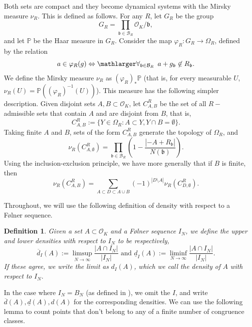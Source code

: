 \documentclass[a4paper,11pt,reqno]{amsart}
\theoremstyle{plain}
\newtheorem{definition}[theorem]{Definition}
\theoremstyle{remark}
\newcommand{\cb}{\mathcal{B}}
\newcommand{\cbr}{\mathcal{B}_R}
\newcommand{\co}{\mathcal{O}}
\newcommand{\gb}{\mathfrak{b}}
\newcommand{\mmp}{\mathbb{P}}
\begin{document}
Both sets are compact and they become dynamical systems with the Mirsky measure $\nu_R$. This is defined as follows. For any $R$, let $G_R$ be the group
\begin{equation}
	\label{eq:GR}
	G_R = \prod_{\gb \in \cb_R} \co_K/\gb,
\end{equation}
  and let $\mmp$ be the Haar measure in $G_R$. Consider the map $\varphi_R:G_R \rightarrow \Omega_R$, defined by the relation \begin{equation}
	a \in \varphi_R(g) \Leftrightarrow \mathlarger \forall_{\gb \in \cbr} \hspace{5pt} a+g_\gb \not \in R_\gb.
\end{equation} 	We define the Mirsky measure $\nu_R$ as $(\varphi_R)_*\mmp$ (that is, for every measurable $U$, $\nu_R(U) = \mmp((\varphi_R)^{-1}(U))$). This measure has the following simpler description. Given disjoint sets $A,B\subset \co_K$, let $C^R_{A,B}$ be the set of all $R-$admissible sets that contain $A$ and are disjoint from $B$, that is,  $$C^R_{A,B} := \{Y\in \Omega_R: A \subset Y,  Y \cap B = \emptyset\}.$$ Taking finite $A$ and $B$, sets of the form $C^R_{A,B}$ generate the topology of $\Omega_{R}$, and \begin{equation}
\label{eq:Formula for nu_R with B empty}
\nu_R(C^R_{A,\emptyset}) =\prod_{\gb \in \cbr} \left(1-\frac{|-A+R_\gb|}{N(\gb)}\right).
\end{equation} Using the inclusion-exclusion principle, we have more generally that if $B$ is finite, then $$\nu_R(C^R_{A,B})  = \sum_{A \subset D \subset  A\cup B} (-1)^{|D\setminus A|}\nu_R(C^R_{D,\emptyset}).$$

Throughout, we will use the following definition of density with respect to a Følner sequence.


\begin{definition}
	\label{def: density}
	Given a set $A \subset \co_K$ and a Følner sequence $I_N$, we define the upper and lower densities with respect to $I_N$ to be respectively,  $$\overline{d}_I(A) := \limsup_{N \rightarrow \infty} \frac{|A \cap I_N|}{|I_N|} \text{ and } \underline{d}_I(A) := \liminf_{N \rightarrow \infty} \frac{|A \cap I_N|}{|I_N|}.$$ If these agree, we write the limit as $d_I(A)$, which we call the density of $A$ with respect to $I_N$.
\end{definition}

In the case where $I_N = B_N$ (as defined in ), we omit the $I$, and write $\overline{d}(A),\underline{d}(A),d(A)$ for the corresponding densities. We can use the following lemma to count points that don't belong to any of a finite number of congruence classes.
\end{document}
